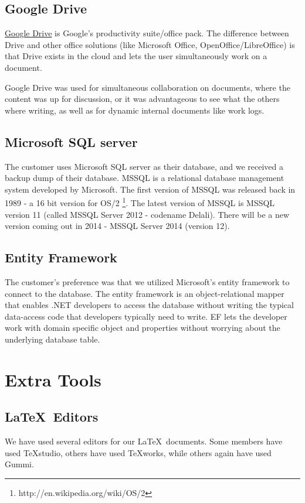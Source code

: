 \subsection{Google Drive}
\href{https://drive.google.com/}{Google Drive} is Google's productivity suite/office pack. The difference between Drive and other office solutions (like Microsoft Office, OpenOffice/LibreOffice) is that Drive exists in the cloud and lets the user simultaneously work on a document.

Google Drive was used for simultaneous collaboration on documents, where the content was up for discussion, or it was advantageous to see what the others where writing, as well as for dynamic internal documents like work logs.

\subsection{Microsoft SQL server}
The customer uses Microsoft SQL server as their database, and we received a backup dump of their database. MSSQL is a relational database management system developed by Microsoft. The first version of MSSQL was released back in 1989 - a 16 bit version for OS/2 \footnote{http://en.wikipedia.org/wiki/OS/2}. The latest version of MSSQL is MSSQL version 11 (called MSSQL Server 2012 - codename Delali). There will be a new version coming out in 2014 - MSSQL Server 2014 (version 12).

\subsection{Entity Framework}
The customer's preference was that we utilized Microsoft's entity framework to connect to the database. The entity framework is an object-relational mapper that enables .NET developers to access the database without writing the typical data-access code that developers typically need to write. EF lets the developer work with domain specific object and properties without worrying about the underlying database table.

\section{Extra Tools}
\subsection{\LaTeX \ Editors}%
We have used several editors for our \LaTeX \ documents. Some members have used TeXstudio, others have used TeXworks, while others again have used Gummi.

